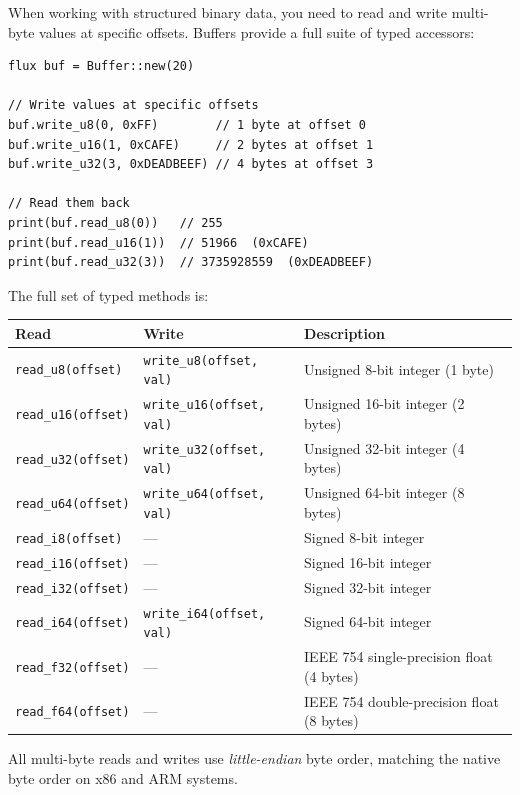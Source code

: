When working with structured binary data, you need to read and write
multi-byte values at specific offsets. Buffers provide a full suite of typed
accessors:

\begin{lstlisting}[language=Lattice, caption={Typed buffer reads and writes}]
flux buf = Buffer::new(20)

// Write values at specific offsets
buf.write_u8(0, 0xFF)        // 1 byte at offset 0
buf.write_u16(1, 0xCAFE)     // 2 bytes at offset 1
buf.write_u32(3, 0xDEADBEEF) // 4 bytes at offset 3

// Read them back
print(buf.read_u8(0))   // 255
print(buf.read_u16(1))  // 51966  (0xCAFE)
print(buf.read_u32(3))  // 3735928559  (0xDEADBEEF)
\end{lstlisting}

The full set of typed methods is:

\begin{center}
\begin{tabular}{llp{7cm}}
\toprule
\textbf{Read} & \textbf{Write} & \textbf{Description} \\
\midrule
\lstinline|read_u8(offset)| & \lstinline|write_u8(offset, val)| & Unsigned 8-bit integer (1 byte) \\
\lstinline|read_u16(offset)| & \lstinline|write_u16(offset, val)| & Unsigned 16-bit integer (2 bytes) \\
\lstinline|read_u32(offset)| & \lstinline|write_u32(offset, val)| & Unsigned 32-bit integer (4 bytes) \\
\lstinline|read_u64(offset)| & \lstinline|write_u64(offset, val)| & Unsigned 64-bit integer (8 bytes) \\
\lstinline|read_i8(offset)| & --- & Signed 8-bit integer \\
\lstinline|read_i16(offset)| & --- & Signed 16-bit integer \\
\lstinline|read_i32(offset)| & --- & Signed 32-bit integer \\
\lstinline|read_i64(offset)| & \lstinline|write_i64(offset, val)| & Signed 64-bit integer \\
\lstinline|read_f32(offset)| & --- & IEEE 754 single-precision float (4 bytes) \\
\lstinline|read_f64(offset)| & --- & IEEE 754 double-precision float (8 bytes) \\
\bottomrule
\end{tabular}
\end{center}

All multi-byte reads and writes use \emph{little-endian} byte order, matching
the native byte order on x86 and ARM systems.

